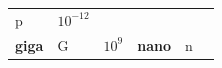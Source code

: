 {\begin{tabular}[t]{|l|l|l|l|l|l|}
    
        p &
    
    
        
                \begin{math}{10}^{-12}\end{math}
     \tabularnewline\cline{1-1}\cline{2-2}\cline{3-3}\cline{4-4}\cline{5-5}\cline{6-6}
    
    
        
                \textbf{giga}
               &
    
    
        G &
    
    
        
                \begin{math}{10}^{9}\end{math}
               &
    
    
        
                \textbf{nano}
               &
    
    
        n &
    

\end{tabular}}

